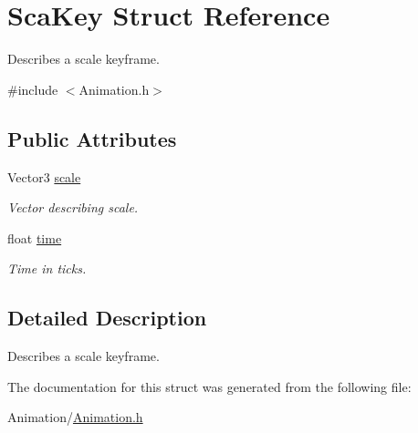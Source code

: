 \hypertarget{structScaKey}{}\section{Sca\+Key Struct Reference}
\label{structScaKey}


Describes a scale keyframe.  




{\ttfamily \#include $<$Animation.\+h$>$}

\subsection*{Public Attributes}
\begin{DoxyCompactItemize}
\item 
\mbox{\label{structScaKey_a32a2b51d9dafce23f6a8f23e8fe290ac}} 
Vector3 \hyperlink{structScaKey_a32a2b51d9dafce23f6a8f23e8fe290ac}{scale}
\begin{DoxyCompactList}\small\item\em Vector describing scale. \end{DoxyCompactList}\item 
\mbox{\label{structScaKey_a51097f41b77a84967554499aec9e3805}} 
float \hyperlink{structScaKey_a51097f41b77a84967554499aec9e3805}{time}
\begin{DoxyCompactList}\small\item\em Time in ticks. \end{DoxyCompactList}\end{DoxyCompactItemize}


\subsection{Detailed Description}
Describes a scale keyframe. 

The documentation for this struct was generated from the following file\+:\begin{DoxyCompactItemize}
\item 
Animation/\hyperlink{Animation_8h}{Animation.\+h}\end{DoxyCompactItemize}
